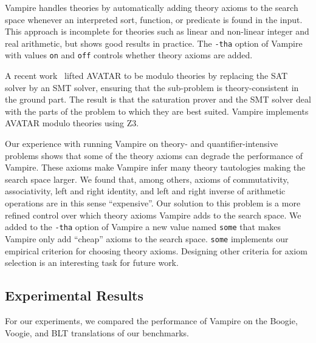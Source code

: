 Vampire handles theories by automatically adding theory axioms to the search space whenever an interpreted sort, function, or predicate is found in the input. This approach is incomplete for theories such as linear and non-linear integer and real arithmetic, but shows good results in practice. The \verb'-tha' option of Vampire with values \verb'on' and \verb'off' controls whether theory axioms are added.

A recent work~\cite{DBLP:conf/gcai/RegerB0V16} lifted AVATAR to be modulo theories by replacing the SAT solver by an SMT solver, ensuring that the sub-problem is theory-consistent in the ground part. The result is that the saturation prover and the SMT solver deal with the parts of the problem to which they are best suited. Vampire implements AVATAR modulo theories using Z3.

Our experience with running Vampire on theory- and quan\-ti\-fier-in\-ten\-si\-ve problems shows that some of the theory axioms can degrade the performance of Vampire. These axioms make Vampire infer many theory tautologies making the search space larger. We found that, among others, axioms of commutativity, associativity, left and right identity, and left and right inverse of arithmetic operations are in this sense ``expensive''. Our solution to this problem is a more refined control over which theory axioms Vampire adds to the search space. We added to the \verb'-tha' option of Vampire a new value named \verb'some' that makes Vampire only add ``cheap'' axioms to the search space. \verb'some' implements our empirical criterion for choosing theory axioms. Designing other criteria for axiom selection is an interesting task for future work.


\subsection{Experimental Results}\label{sec:boogie/experiments/results}
For our experiments, we compared the performance of Vampire on the Boogie, Voogie, and BLT translations of our benchmarks. 

